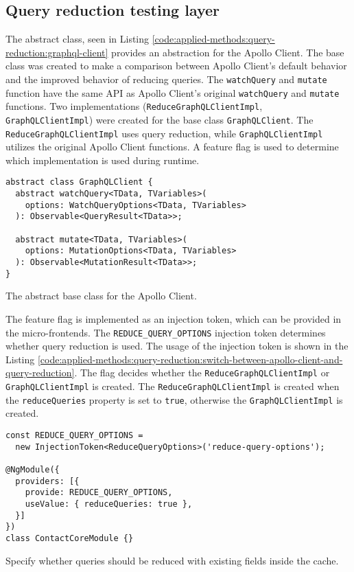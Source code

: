 \subsection{Query reduction testing layer}\label{subsection:applied-methods:query-reduction:testing-query-reduction}

The abstract class, seen in Listing \ref{code:applied-methods:query-reduction:graphql-client} provides an abstraction for the Apollo Client. The base class was created to make a comparison between Apollo Client's default behavior and the improved behavior of reducing queries. The \texttt{watchQuery} and \texttt{mutate} function have the same \ac{API} as Apollo Client's original \texttt{watchQuery} and \texttt{mutate} functions. Two implementations (\texttt{ReduceGraphQLClientImpl}, \texttt{GraphQLClientImpl}) were created for the base class \texttt{GraphQLClient}. The \texttt{ReduceGraphQLClientImpl} uses query reduction, while \texttt{GraphQLClientImpl} utilizes the original Apollo Client functions. A feature flag is used to determine which implementation is used during runtime.

\ifshowListings
\begin{listing}[H]
\begin{verbatim}
abstract class GraphQLClient {
  abstract watchQuery<TData, TVariables>(
    options: WatchQueryOptions<TData, TVariables>
  ): Observable<QueryResult<TData>>;

  abstract mutate<TData, TVariables>(
    options: MutationOptions<TData, TVariables>
  ): Observable<MutationResult<TData>>;
}
\end{verbatim}
\caption{The abstract base class for the Apollo Client.}\label{code:applied-methods:query-reduction:graphql-client}
\end{listing}
\fi

\noindent The feature flag is implemented as an injection token, which can be provided in the micro-frontends. The \texttt{REDUCE\_QUERY\_OPTIONS} injection token determines whether query reduction is used. The usage of the injection token is shown in the Listing \ref{code:applied-methods:query-reduction:switch-between-apollo-client-and-query-reduction}. The flag decides whether the \texttt{ReduceGraphQLClientImpl} or \texttt{GraphQLClientImpl} is created. The \texttt{ReduceGraphQLClientImpl} is created when the \texttt{reduceQueries} property is set to \texttt{true}, otherwise the \texttt{GraphQLClientImpl} is created.

\ifshowListings
\begin{listing}[H]
\begin{verbatim}
const REDUCE_QUERY_OPTIONS = 
  new InjectionToken<ReduceQueryOptions>('reduce-query-options');

@NgModule({
  providers: [{
    provide: REDUCE_QUERY_OPTIONS,
    useValue: { reduceQueries: true },
  }]
})
class ContactCoreModule {}
\end{verbatim}
\caption{Specify whether queries should be reduced with existing fields inside the cache.}\label{code:applied-methods:query-reduction:switch-between-apollo-client-and-query-reduction}
\end{listing}
\fi

